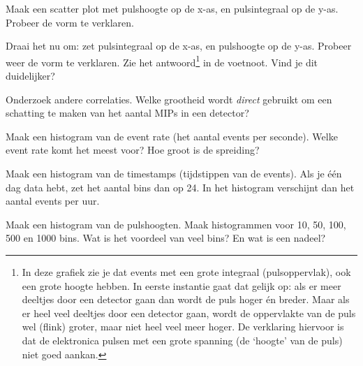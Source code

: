 \begin{questions}
\question Maak een scatter plot met pulshoogte op de x-as, en
pulsintegraal op de y-as. Probeer de vorm te verklaren.

\question Draai het nu om: zet pulsintegraal op de x-as, en pulshoogte op
de y-as. Probeer weer de vorm te verklaren. Zie het antwoord\footnote{In
deze grafiek zie je dat events met een grote integraal (pulsoppervlak),
ook een grote hoogte hebben. In eerste instantie gaat dat gelijk op: als
er meer deeltjes door een detector gaan dan wordt de puls hoger én breder.
Maar als er heel veel deeltjes door een detector gaan, wordt de
oppervlakte van de puls wel (flink) groter, maar niet heel veel meer
hoger. De verklaring hiervoor is dat de elektronica pulsen met een grote
spanning (de `hoogte' van de puls) niet goed aankan.} in de voetnoot. Vind
je dit duidelijker?

\question Onderzoek andere correlaties. Welke grootheid wordt
\emph{direct} gebruikt om een schatting te maken van het aantal MIPs in
een detector?





\question Maak een histogram van de event rate (het aantal events per
seconde).  Welke event rate komt het meest voor? Hoe groot is de
spreiding?

\question Maak een histogram van de timestamps (tijdstippen van de
events). Als je één dag data hebt, zet het aantal bins dan op 24. In het
histogram verschijnt dan het aantal events per uur.

\question Maak een histogram van de pulshoogten. Maak histogrammen voor
10, 50, 100, 500 en 1000 bins. Wat is het voordeel van veel bins? En wat
is een nadeel?



\end{questions}
